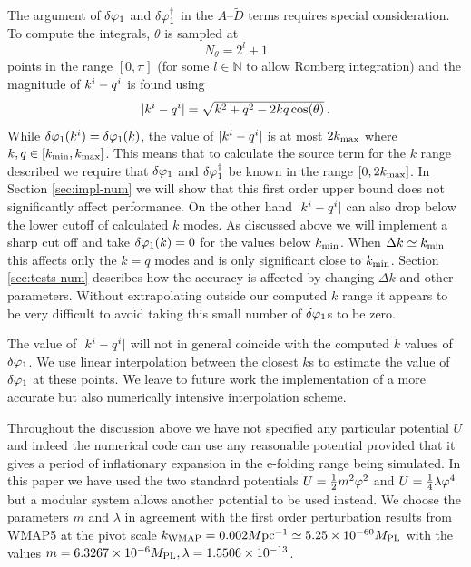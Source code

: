 The argument of $\delta\varphi_{1}$ and $\delta\varphi_{1}^{\dagger}$ in the $A$--$\tilde{D}$ terms requires
special consideration. 
To compute the integrals, $\theta$ is sampled at 
% 
\begin{equation}
\label{eq:nthetadefn}
N_\theta = 2^l + 1
\end{equation}
% 
points in the range
$[0,\pi]$ (for some $l\in \mathbb{N}$ to allow Romberg integration) and the magnitude of
$k^i-q^i$
is
found using
% 
\begin{equation}
 |k^i -q^i| = \sqrt{k^2 + q^2 - 2kq\cos(\theta)}\,.
\end{equation}
%
While $\delta\varphi_{1}(k^i)=\delta\varphi_{1}(k)$, the value of $|k^i-q^i|$ is at most
$2k_{\mathrm{max}}$ where $k,q \in [k_{\mathrm{min}},k_{\mathrm{max}}]$. This means that to calculate
the source term for the $k$ range described we require that $\delta\varphi_{1}$
and $\delta\varphi_{1}^{\dagger}$ be known in the range $[0, 2k_{\mathrm{max}}]$. In
Section \ref{sec:impl-num} we will 
show that this first order upper bound does not significantly affect
performance. On the other hand $|k^i-q^i|$ can also drop below the
lower cutoff of calculated $k$ modes. As discussed above we will implement a sharp cut off and
take $\delta\varphi_{1}(k)=0$ for the values below
$k_{\mathrm{min}}$. When $\Delta k \simeq k_{\mathrm{min}}$ this affects only the $k=q$ modes and
is only significant close to $k_{\mathrm{min}}$. Section \ref{sec:tests-num}
describes how the accuracy is affected by changing $\Delta k$ and
other parameters. Without extrapolating outside our computed $k$ range
it appears to be very difficult to avoid taking this small number of
$\delta\varphi_{1}$s to be zero.


The value of $|k^i-q^i|$ will not in general coincide with the computed $k$
values of $\delta\varphi_{1}$. We use linear interpolation between the closest $k$s to
estimate the value of $\delta\varphi_{1}$ at these points. We leave to future work the
implementation of a more
accurate but also numerically intensive interpolation scheme.


Throughout the discussion above we have not specified any particular
potential $U$ and indeed the numerical code can use any reasonable
potential provided that it gives a period of inflationary expansion in
the e-folding range being simulated. In this paper we have used the two
standard potentials $U=\frac{1}{2} m^2 \varphi^2$ and $U=\frac{1}{4}\lambda\varphi^4$
but a modular system allows another potential to be used instead. We
choose the parameters $m$ and $\lambda$ in agreement with the first
order perturbation results from WMAP5 at the pivot scale
$k_\mathrm{WMAP}=0.002M \mathrm{pc}^{-1} \simeq5.25\times10^{- 60} M_{\mathrm{PL}}$ with the values $m=6.3267\times10^{-6}
M_{\mathrm{PL}}, \lambda=1.5506\times10^{-13}$.

